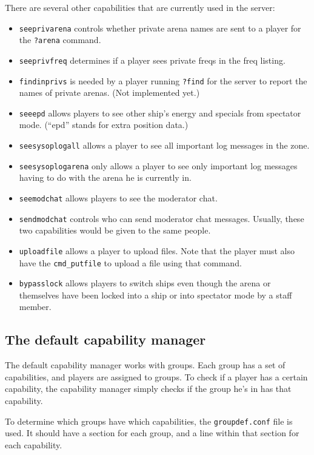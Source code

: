 \documentclass{article}
\begin{document}
There are several other capabilities that are currently used in the
server:

\begin{itemize}
\item{\texttt{seeprivarena}} controls whether private arena names are
sent to a player for the \verb/?arena/ command.
\item{\texttt{seeprivfreq}} determines if a player sees private freqs in
the freq listing.
\item{\texttt{findinprivs}} is needed by a player running \verb/?find/
for the server to report the names of private arenas. (Not implemented
yet.)
\item{\texttt{seeepd}} allows players to see other ship's energy and
specials from spectator mode. (``epd'' stands for extra position data.)
\item{\texttt{seesysoplogall}} allows a player to see all important log
messages in the zone.
\item{\texttt{seesysoplogarena}} only allows a player to see only
important log messages having to do with the arena he is currently in.
\item{\texttt{seemodchat}} allows players to see the moderator chat.
\item{\texttt{sendmodchat}} controls who can send moderator chat
messages. Usually, these two capabilities would be given to the same
people.
\item{\texttt{uploadfile}} allows a player to upload files. Note that
the player must also have the \texttt{cmd\_putfile} to upload a file
using that command.
\item{\texttt{bypasslock}} allows players to switch ships even though
the arena or themselves have been locked into a ship or into spectator
mode by a staff member.
\end{itemize}


\subsection{The default capability manager}

The default capability manager works with groups. Each group has a set
of capabilities, and players are assigned to groups. To check if a
player has a certain capability, the capability manager simply checks if
the group he's in has that capability.

To determine which groups have which capabilities, the
\verb/groupdef.conf/ file is used. It should have a section for each
group, and a line within that section for each capability.
\end{document}
